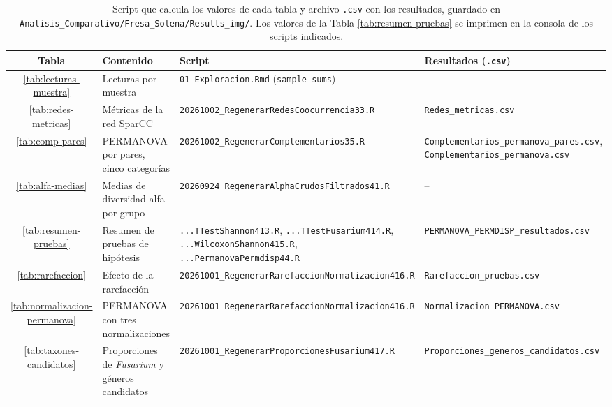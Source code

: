 \begin{table}[H]
\centering
\caption{Script que calcula los valores de cada tabla y archivo \texttt{.csv} con los resultados,
guardado en \texttt{Analisis\_Comparativo/Fresa\_Solena/Results\_img/}. Los valores de la
Tabla \ref{tab:resumen-pruebas} se imprimen en la consola de los scripts indicados.}
\label{tab:proc-tablas}
\scriptsize
\setlength{\tabcolsep}{3pt}
\begin{tabular}{cp{3.0cm}p{4.7cm}p{3.0cm}}
\hline
Tabla & Contenido & Script & Resultados (\texttt{.csv}) \\
\hline
\ref{tab:lecturas-muestra} & Lecturas por muestra & \texttt{01\_Exploracion.Rmd} (\texttt{sample\_sums}) & -- \\
\ref{tab:redes-metricas} & Métricas de la red SparCC & \texttt{20261002\_Regenerar}\newline\texttt{RedesCoocurrencia33.R} & \texttt{Redes\_metricas.csv} \\
\ref{tab:comp-pares} & PERMANOVA por pares, cinco categorías & \texttt{20261002\_Regenerar}\newline\texttt{Complementarios35.R} & \texttt{Complementarios\_}\newline\texttt{permanova\_pares.csv}, \texttt{Complementarios\_}\newline\texttt{permanova.csv} \\
\ref{tab:alfa-medias} & Medias de diversidad alfa por grupo & \texttt{20260924\_Regenerar}\newline\texttt{AlphaCrudosFiltrados41.R} & -- \\
\ref{tab:resumen-pruebas} & Resumen de pruebas de hipótesis & \texttt{...TTestShannon413.R}, \texttt{...TTestFusarium414.R}, \texttt{...WilcoxonShannon415.R}, \texttt{...PermanovaPermdisp44.R} & \texttt{PERMANOVA\_PERMDISP\_}\newline\texttt{resultados.csv} \\
\ref{tab:rarefaccion} & Efecto de la rarefacción & \texttt{20261001\_Regenerar}\newline\texttt{RarefaccionNormalizacion416.R} & \texttt{Rarefaccion\_}\newline\texttt{pruebas.csv} \\
\ref{tab:normalizacion-permanova} & PERMANOVA con tres normalizaciones & \texttt{20261001\_Regenerar}\newline\texttt{RarefaccionNormalizacion416.R} & \texttt{Normalizacion\_}\newline\texttt{PERMANOVA.csv} \\
\ref{tab:taxones-candidatos} & Proporciones de \textit{Fusarium} y géneros candidatos & \texttt{20261001\_Regenerar}\newline\texttt{ProporcionesFusarium417.R} & \texttt{Proporciones\_generos\_}\newline\texttt{candidatos.csv} \\
\hline
\end{tabular}
\end{table}

